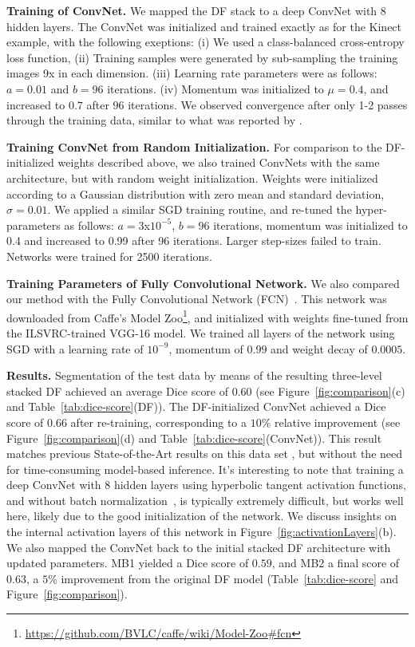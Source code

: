 \documentclass[twocolumn]{svjour3}
\begin{document}
\textbf{Training of ConvNet. }
We mapped the DF stack to a deep ConvNet with 8 hidden layers.
The ConvNet was initialized and trained exactly as for the Kinect example, with the following exeptions:
(i) We used a class-balanced cross-entropy loss function,
(ii) Training samples were generated by sub-sampling the training images 9x in each dimension.
(iii) Learning rate parameters were as follows: $a = 0.01$ and $b = 96$ iterations.
(iv) Momentum was initialized to $\mu = 0.4$, and increased to $0.7$ after $96$ iterations.
We observed convergence after only 1-2 passes through the training data, similar to what was reported by \cite{GirshickDDM14}.

\textbf{Training ConvNet from Random Initialization. }
For comparison to the DF-initialized weights described above, we also trained ConvNets with the same architecture, but with random weight initialization.
Weights were initialized according to a Gaussian distribution with zero mean and standard deviation, $\sigma = 0.01$.
We applied a similar SGD training routine, and re-tuned the hyper-parameters as follows: $a = 3$x$10^{-5}$, $b=96$ iterations, momentum was initialized to 0.4 and increased to 0.99 after 96 iterations.
Larger step-sizes failed to train.
Networks were trained for 2500 iterations.

\textbf{Training Parameters of Fully Convolutional Network. }
We also compared our method with the Fully Convolutional Network (FCN)~\cite{long_shelhamer_fcn_2015}.
This network was downloaded from Caffe's Model Zoo\footnote{\url{https://github.com/BVLC/caffe/wiki/Model-Zoo\#fcn}}, and initialized with weights fine-tuned from the ILSVRC-trained VGG-16 model.
We trained all layers of the network using SGD with a learning rate of $10^{-9}$, momentum of $0.99$ and weight decay of $0.0005$.

\textbf{Results. }
Segmentation of the test data by means of the resulting three-level stacked DF achieved an average Dice score of 0.60
(see Figure~\ref{fig:comparison}(c)
and Table~\ref{tab:dice-score}(DF)).
The DF-initialized ConvNet achieved a Dice score of 0.66 after re-training, corresponding to a $10\%$ relative improvement
(see Figure~\ref{fig:comparison}(d)
and Table~\ref{tab:dice-score}(ConvNet)).
This result matches previous State-of-the-Art results on this data set \cite{richmueller}, but without the need for time-consuming model-based inference.
It's interesting to note that training a deep ConvNet with 8 hidden layers using hyperbolic tangent activation functions, and without batch normalization~\cite{batchnorm}, is typically extremely difficult, but works well here, likely due to the good initialization of the network.
We discuss insights on the internal activation layers of this network in Figure~\ref{fig:activationLayers}(b).
We also mapped the ConvNet back to the initial stacked DF architecture with updated parameters.
MB1 yielded a Dice score of $0.59$, and MB2 a final score of $0.63$, a $5\%$ improvement from the original DF model (Table~\ref{tab:dice-score} and Figure~\ref{fig:comparison}).
\end{document}
